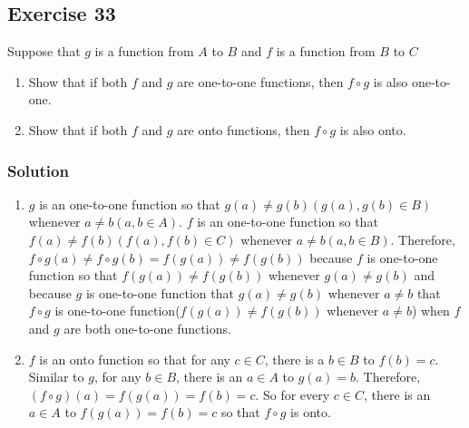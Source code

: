 \documentclass{article}
\theoremstyle{mytheoremstyle}
\theoremstyle{mytheoremstyle}
\theoremstyle{myproblemstyle}
\begin{document}
    \subsection*{Exercise 33}
        Suppose that \(g\) is a function from \(A\) to \(B\) and \(f\) is a function from \(B\) to \(C\)
        \begin{enumerate} [label = (\alph*)]
            \item Show that if both \(f\) and \(g\) are one-to-one functions, then \(f \circ g\) is also one-to-one.
            \item Show that if both \(f\) and \(g\) are onto functions, then \(f \circ g\) is also onto.
        \end{enumerate}
    \subsubsection*{Solution}
        \begin{enumerate} [label = (\alph*)]
            \item \(g\) is an one-to-one function so that \(g(a) \neq g(b)(g(a),g(b) \in B)\) whenever \(a \neq b(a,b \in A)\). \(f\) is an one-to-one
            function so that \(f(a) \neq f(b)(f(a),f(b) \in C)\) whenever \(a \neq b(a,b \in B)\). Therefore,
            \(f \circ g(a) \neq f \circ g(b) = f(g(a)) \neq f(g(b))\) because \(f\) is one-to-one function so that \(f(g(a)) \neq f(g(b))\) whenever \(g(a) \neq g(b)\) and because
            \(g\) is one-to-one function that \(g(a) \neq g(b)\) whenever \(a \neq b\) that \(f \circ g\) is one-to-one function(\(f(g(a)) \neq f(g(b))\) whenever \(a \neq b\)) when \(f\) and \(g\) are both one-to-one functions.
            \item \(f\) is an onto function so that for any \(c \in C\), there is a \(b \in B\) to \(f(b) = c\). Similar to \(g\), for any \(b \in B\), there is an \(a \in A\) to \(g(a) = b\). Therefore,
            \((f \circ g)(a) = f(g(a)) = f(b) = c\). So for every \(c \in C\), there is an \(a \in A\) to \(f(g(a)) = f(b) = c\) so that \(f \circ g\) is onto.
        \end{enumerate}
\end{document}
